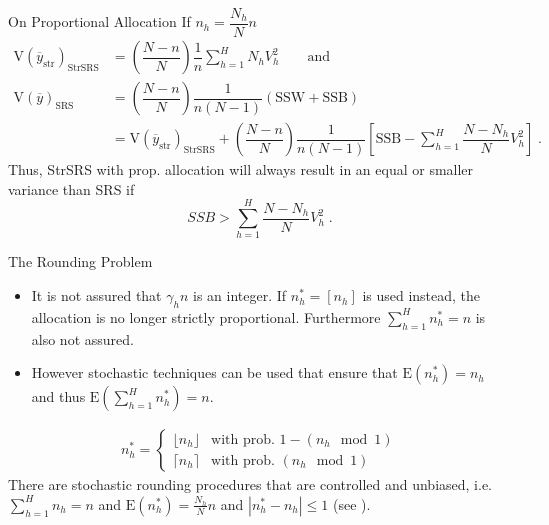 \documentclass[10pt]{beamer}\usepackage[]{graphicx}\usepackage[]{color}
\newcommand{\E}[1]{\text{E}\left(#1\right)}
\newcommand{\V}[1]{\text{V}\left(#1\right)}
\begin{document}
\begin{frame}{On Proportional Allocation}
If $n_h =  \dfrac{N_h}{N}  n$  
\begin{align*}
\V{\overline{y}_{\text{str}}}_{\text{StrSRS}} & = \left( \dfrac{N - n}{N} \right) \dfrac{1}{n} \sum_{h=1}^H N_h  V_{h}^2\qquad \text{and }\\
\V{\overline{y}}_{\text{SRS}} & = \left( \dfrac{N - n}{N} \right) \dfrac{1}{n(N-1)} \left( \text{SSW} + \text{SSB} \right) \\
& = \V{\overline{y}_{\text{str}}}_{\text{StrSRS}} + \left(\dfrac{N - n}{N}  \right) \dfrac{1}{n(N-1)}\left[ \text{SSB} - \sum_{h=1}^H \dfrac{N - N_h}{N} V^2_{h}  \right]\;.
\end{align*}
Thus, StrSRS with prop. allocation will always result in an equal or smaller variance than SRS if
$$ SSB > \sum_{h=1}^H \dfrac{N - N_h}{N} V^2_{h} \;.$$
\end{frame}


\begin{frame}{The Rounding Problem}
  \begin{itemize}
  \item It is not assured that $\gamma_h n$ is an integer. If 
$n_h^{\ast}=\left[ n_h \right]$ is used instead, the allocation is no longer
strictly proportional. Furthermore $\sum_{h=1}^H n_h^{\ast}=n$ is also not assured.
  \item However stochastic techniques can be used that ensure that $\E{n_h^{\ast}}=n_h$ and
thus $\E{\sum_{h=1}^H n_h^{\ast}}=n$.
 \end{itemize}
  \begin{gather*}
  n_h^{\ast} = \begin{cases} \lfloor n_h \rfloor & \mbox{with prob. } 1 - (n_h \mod{1}) \\
			    \lceil  n_h \rceil  & \mbox{with prob. } (n_h \mod{1})
                \end{cases} 
 \end{gather*}
 There are stochastic rounding procedures that are controlled and unbiased, i.e. $\sum_{h=1}^H n_h =n$ and  $\E{n^{\ast}_h} = \frac{N_h}{N} n$ and $|n^{\ast}_{h} - n_{h}| \leq 1$ (see \cite{Cox1987}).
\end{frame}


\end{document}
